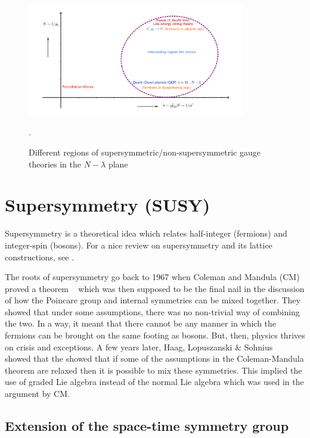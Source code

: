 \begin{figure}
\begin{center}\includegraphics[width=0.85\textwidth]{./Figures/N_lam_phase.pdf}\end{center}
\caption{\label{fig:Nlam1}Different regions of supersymmetric/non-supersymmetric gauge theories in the $N-\lambda$ plane}. 
\end{figure}

\section{Supersymmetry (SUSY)}

Supersymmetry is a theoretical idea which relates half-integer (fermions) and
integer-spin (bosons). For a nice review on supersymmetry and its lattice constructions, 
see \cite{Argyres:2001eva, Seiberg:1997ax, Catterall:2009it}. 

The roots of supersymmetry go back to 1967 when Coleman and Mandula (CM) proved a theorem ~\cite{Coleman:1967ad} 
which was then supposed to be the final nail in the discussion of how the Poincare group and internal symmetries can 
be mixed together. 
They showed that under some assumptions, there was no non-trivial way of combining the two. In a way, it meant that 
there cannot be any manner in which the fermions can be brought on the same footing as bosons. But, then, physics 
thrives on crisis and exceptions. A few years later, Haag, Lopuszanski \& Sohnius ~\cite{Haag:1974qh} showed that the 
showed that if some of the assumptions in the Coleman-Mandula theorem are relaxed then it is possible to mix these symmetries. 
This implied the use of graded Lie algebra instead of the normal Lie algebra which was used in the argument by CM.  


\subsection{Extension of the space-time symmetry group} 

